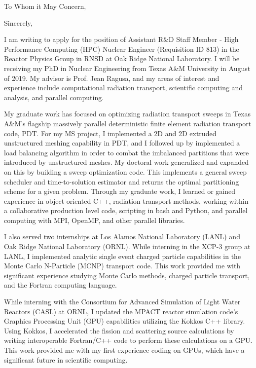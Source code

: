 \documentclass[11pt,letterpaper,roman]{moderncv}        %
\begin{document}
\date{\today}
\opening{To Whom it May Concern,}
\closing{Sincerely,}

\makelettertitle

I am writing to apply for the position of Assistant R\&D Staff Member - High Performance Computing (HPC) Nuclear Engineer (Requisition ID 813) in the Reactor Physics Group in RNSD at Oak Ridge National Laboratory. I will be receiving my PhD in Nuclear Engineering from Texas A\&M University in August of 2019. My advisor is Prof. Jean Ragusa, and my areas of interest and experience include computational radiation transport, scientific computing and analysis, and parallel computing. 

My graduate work has focused on optimizing radiation transport sweeps in Texas A\&M's flagship massively parallel deterministic finite element radiation transport code, PDT. For my MS project, I implemented a 2D and 2D extruded unstructured meshing capability in PDT, and I followed up by implemented a load balancing algorithm in order to combat the imbalanced partitions that were introduced by unstructured meshes. My doctoral work generalized and expanded on this by building a sweep optimization code. This implements a general sweep scheduler and time-to-solution estimator and returns the optimal partitioning scheme for a given problem. Through my graduate work, I learned or gained experience in object oriented C++, radiation transport methods, working within a collaborative production level code, scripting in bash and Python, and parallel computing with MPI, OpenMP, and other parallel libraries.

I also served two internships at Los Alamos National Laboratory (LANL) and Oak Ridge National Laboratory (ORNL). While interning in the XCP-3 group at LANL, I implemented analytic single event charged particle capabilities in the Monte Carlo N-Particle (MCNP) transport code. This work provided me with significant experience studying Monte Carlo methods, charged particle transport, and the Fortran computing language. 

While interning with the Consortium for Advanced Simulation of Light Water Reactors (CASL) at ORNL, I updated the MPACT reactor simulation code's Graphics Processing Unit (GPU) capabilities utilizing the Kokkos C++ library. Using Kokkos, I accelerated the fission and scattering source calculations by writing interoperable Fortran/C++ code to perform these calculations on a GPU. This work provided me with my first experience coding on GPUs, which have a significant future in scientific computing.
\end{document}

